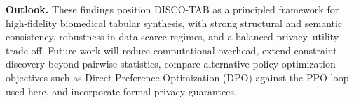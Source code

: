 \textbf{Outlook.}
These findings position DISCO-TAB as a principled framework for high-fidelity biomedical tabular synthesis, with strong structural and semantic consistency, robustness in data-scarce regimes, and a balanced privacy--utility trade-off. Future work will reduce computational overhead, extend constraint discovery beyond pairwise statistics, compare alternative policy-optimization objectives such as Direct Preference Optimization (DPO) against the PPO loop used here, and incorporate formal privacy guarantees.





